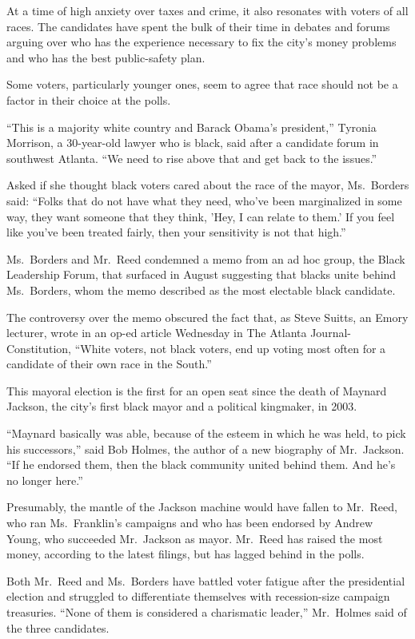 ﻿\documentclass[12pt]{article}
\begin{document}
At a time of high anxiety over taxes and crime, it also resonates with voters of all races. The
candidates have spent the bulk of their time in debates and forums arguing over who has the
experience necessary to fix the city's money problems and who has the best public-safety plan.

Some voters, particularly younger ones, seem to agree that race should not be a factor in their
choice at the polls.

``This is a majority white country and Barack Obama's president,'' Tyronia Morrison, a 30-year-old
lawyer who is black, said after a candidate forum in southwest Atlanta. ``We need to rise above that
and get back to the issues.''

Asked if she thought black voters cared about the race of the mayor, Ms.~Borders said: ``Folks that
do not have what they need, who've been marginalized in some way, they want someone that they think,
'Hey, I can relate to them.' If you feel like you've been treated fairly, then your sensitivity is
not that high.''

Ms.~Borders and Mr.~Reed condemned a memo from an ad hoc group, the Black Leadership Forum, that
surfaced in August suggesting that blacks unite behind Ms.~Borders, whom the memo described as the
most electable black candidate.

The controversy over the memo obscured the fact that, as Steve Suitts, an Emory lecturer, wrote in
an op-ed article Wednesday in The Atlanta Journal-Constitution, ``White voters, not black voters,
end up voting most often for a candidate of their own race in the South.''

This mayoral election is the first for an open seat since the death of Maynard Jackson, the city's
first black mayor and a political kingmaker, in 2003.

``Maynard basically was able, because of the esteem in which he was held, to pick his successors,''
said Bob Holmes, the author of a new biography of Mr.~Jackson. ``If he endorsed them, then the black
community united behind them. And he's no longer here.''

Presumably, the mantle of the Jackson machine would have fallen to Mr.~Reed, who ran Ms.~Franklin's
campaigns and who has been endorsed by Andrew Young, who succeeded Mr.~Jackson as mayor. Mr.~Reed
has raised the most money, according to the latest filings, but has lagged behind in the polls.

Both Mr.~Reed and Ms.~Borders have battled voter fatigue after the presidential election and
struggled to differentiate themselves with recession-size campaign treasuries. ``None of them is
considered a charismatic leader,'' Mr.~Holmes said of the three candidates.
\end{document}
